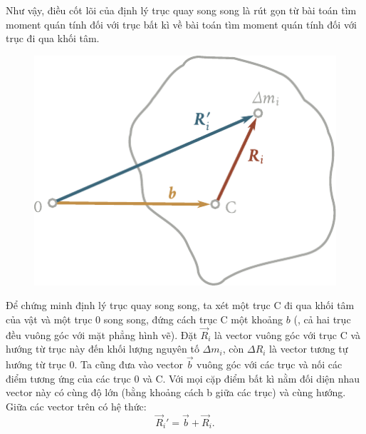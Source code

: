 Như vậy, điều cốt lõi của định lý trục quay song song là rút gọn từ bài toán tìm moment quán tính đối với trục bất kì về bài toán tìm moment quán tính đối với trục đi qua khối tâm.

\begin{figure}[!htb]
	\begin{center}
		\includegraphics[scale=0.93]{figures/ch_05/fig_5_12.pdf}
		\caption[]{}
		\label{fig:5_12}
	\end{center}
\end{figure}

Để chứng minh định lý trục quay song song, ta xét một trục C đi qua khối tâm của vật và một trục $0$ song song, đứng cách trục C một khoảng $b$ (, cả hai trục đều vuông góc với mặt phẳng hình vẽ). Đặt $\vec{R}_i$ là vector vuông góc với trục C và hướng từ trục này đến khối lượng nguyên tố $\Delta m_i$, còn $\Delta R_i$ là vector tương tự hướng từ trục $0$. Ta cũng đưa vào vector $\vec{b}$ vuông góc với các trục và nối các điểm tương ứng của các trục $0$ và C. Với mọi cặp điểm bất kì nằm đối diện nhau vector này có cùng độ lớn (bằng khoảng cách b giữa các trục) và cùng hướng. Giữa các vector trên có hệ thức:
\begin{equation*}
\vec{R}_i' = \vec{b} + \vec{R}_i.
\end{equation*}

